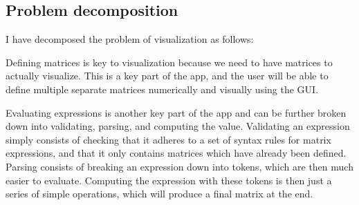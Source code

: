 \documentclass[../main.tex]{subfiles}
\begin{document}
\subsection{Problem decomposition\label{subsection:problem-decomposition}}

I have decomposed the problem of visualization as follows:
\begin{center}
\end{center}
Defining matrices is key to visualization because we need to have matrices to actually visualize. This is a key part of the app, and the user will be able to define multiple separate matrices numerically and visually using the GUI.

Evaluating expressions is another key part of the app and can be further broken down into validating, parsing, and computing the value. Validating an expression simply consists of checking that it adheres to a set of syntax rules for matrix expressions, and that it only contains matrices which have already been defined. Parsing consists of breaking an expression down into tokens, which are then much easier to evaluate. Computing the expression with these tokens is then just a series of simple operations, which will produce a final matrix at the end.
\end{document}
